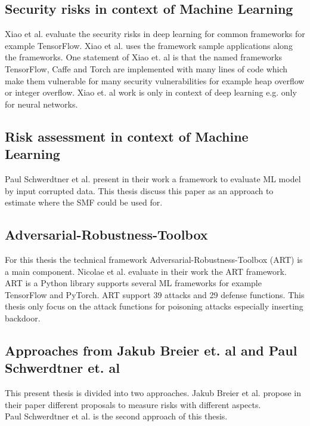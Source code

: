 \subsection{Security risks in context of Machine Learning}

Xiao et al. \cite{DBLP:conf/sp/XiaoLZX18} evaluate the security risks in deep learning for common frameworks for example TensorFlow. Xiao et al. uses the framework sample applications along the
frameworks. One statement of Xiao et. al is that the named frameworks TensorFlow, Caffe and Torch are implemented with many lines of code which make them vulnerable for many security vulnerabilities
for example heap overflow or integer overflow. Xiao et. al work is only in context of deep learning e.g. only for neural networks.

\subsection{Risk assessment in context of Machine Learning}

Paul Schwerdtner et al. \cite{DBLP:journals/corr/abs-2011-04328} present in their
work a framework to evaluate ML model by input corrupted data. This thesis discuss
this paper as an approach to estimate where the SMF could be used for.

\subsection{Adversarial-Robustness-Toolbox}

For this thesis the technical framework Adversarial-Robustness-Toolbox (ART) \cite{art2018} is a main component. Nicolae et al. \cite{DBLP:journals/corr/abs-1807-01069} evaluate in their work the ART framework. ART is a Python library supports several ML frameworks for example TensorFlow and PyTorch. ART support 39 attacks and 29 defense functions. This thesis only focus on the attack functions for poisoning attacks especially inserting backdoor.

\subsection{Approaches from Jakub Breier et. al and Paul Schwerdtner et. al}

This present thesis is divided into two approaches.
Jakub Breier et al. \cite{DBLP:journals/corr/abs-2012-04884} propose in their paper
different proposals to measure risks with different aspects. \\
Paul Schwerdtner et al. \cite{DBLP:journals/corr/abs-2011-04328} is the second approach of this thesis.
